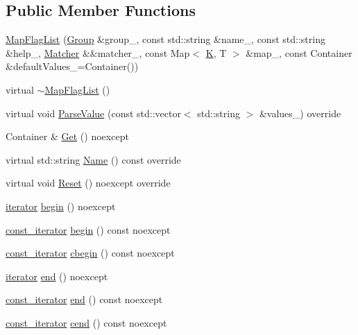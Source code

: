 \subsection*{Public Member Functions}
\begin{DoxyCompactItemize}
\item 
\hyperlink{classargs_1_1_map_flag_list_a8a7d44c211928287ced52601a30268c9}{Map\+Flag\+List} (\hyperlink{classargs_1_1_group}{Group} \&group\+\_\+, const std\+::string \&name\+\_\+, const std\+::string \&help\+\_\+, \hyperlink{classargs_1_1_matcher}{Matcher} \&\&matcher\+\_\+, const Map$<$ \hyperlink{cgal__test_8cpp_a891e241aa245ae63618f03737efba309}{K}, T $>$ \&map\+\_\+, const Container \&default\+Values\+\_\+=Container())
\item 
virtual \hyperlink{classargs_1_1_map_flag_list_a8799bf86215d5a166efc57e1c8b512e2}{$\sim$\+Map\+Flag\+List} ()
\item 
virtual void \hyperlink{classargs_1_1_map_flag_list_af37b4d7e420eabf62bd8dacafa86419c}{Parse\+Value} (const std\+::vector$<$ std\+::string $>$ \&values\+\_\+) override
\item 
Container \& \hyperlink{classargs_1_1_map_flag_list_ada0e7eb9bec54ed768bfa206af4b3bb9}{Get} () noexcept
\item 
virtual std\+::string \hyperlink{classargs_1_1_map_flag_list_a1703584ba7b36c5e15aa375eae23903c}{Name} () const override
\item 
virtual void \hyperlink{classargs_1_1_map_flag_list_a993bb59f57246e246edbd6ac3fc048eb}{Reset} () noexcept override
\item 
\hyperlink{classargs_1_1_map_flag_list_a73b7f3d1f8e2dc8776c195c9d1b66d34}{iterator} \hyperlink{classargs_1_1_map_flag_list_a21d879d48f9adf298b1dd824c5cb2e1b}{begin} () noexcept
\item 
\hyperlink{classargs_1_1_map_flag_list_a6b59eb2e45bf0e576d01b902f3c7a0d7}{const\+\_\+iterator} \hyperlink{classargs_1_1_map_flag_list_a8592b905d9930af771a904ddd02f185f}{begin} () const noexcept
\item 
\hyperlink{classargs_1_1_map_flag_list_a6b59eb2e45bf0e576d01b902f3c7a0d7}{const\+\_\+iterator} \hyperlink{classargs_1_1_map_flag_list_ae2a91b86b914cfcb9bdf1d855d50f7e2}{cbegin} () const noexcept
\item 
\hyperlink{classargs_1_1_map_flag_list_a73b7f3d1f8e2dc8776c195c9d1b66d34}{iterator} \hyperlink{classargs_1_1_map_flag_list_a53c9c5bf837f5b27b72a599069a87884}{end} () noexcept
\item 
\hyperlink{classargs_1_1_map_flag_list_a6b59eb2e45bf0e576d01b902f3c7a0d7}{const\+\_\+iterator} \hyperlink{classargs_1_1_map_flag_list_ac6c7c678cc3680a6df82b972aeaee561}{end} () const noexcept
\item 
\hyperlink{classargs_1_1_map_flag_list_a6b59eb2e45bf0e576d01b902f3c7a0d7}{const\+\_\+iterator} \hyperlink{classargs_1_1_map_flag_list_a565f9a371dc12dcdb4665057cf465709}{cend} () const noexcept
\end{DoxyCompactItemize}
